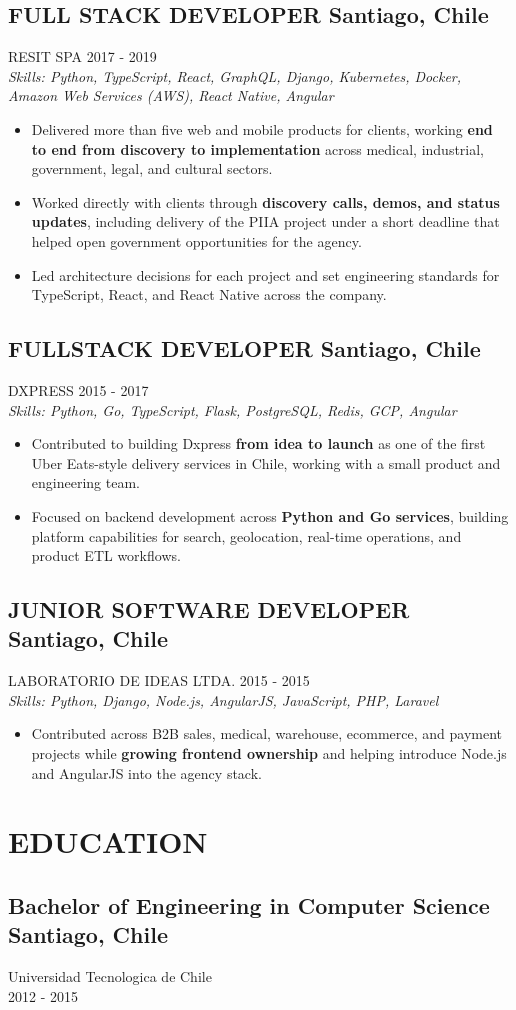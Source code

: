 \documentclass{article}
\newcommand{\SubHeading}[1]{
   \subsection*{#1}\vspace{-0.5em}
}
\newcommand{\WorkExperience}[2]{
   \subsection*{#1}
   \vspace{-1em}
   \uppercase{#2}
}
\newcommand{\Skills}[1]{
   \textit{Skills: #1}
}
\begin{document}
\WorkExperience{FULL STACK DEVELOPER \hfill Santiago, Chile}{Resit SPA \hfill 2017 {-} 2019} \\
\Skills{Python, TypeScript, React, GraphQL, Django, Kubernetes, Docker, Amazon Web Services (AWS), React Native, Angular}
\begin{itemize}
	\item Delivered more than five web and mobile products for clients, working \textbf{end to end from discovery to implementation} across medical, industrial, government, legal, and cultural sectors.
	\item Worked directly with clients through \textbf{discovery calls, demos, and status updates}, including delivery of the PIIA project under a short deadline that helped open government opportunities for the agency.
	\item Led architecture decisions for each project and set engineering standards for TypeScript, React, and React Native across the company.
\end{itemize}

\WorkExperience{FULLSTACK DEVELOPER \hfill Santiago, Chile}{Dxpress \hfill 2015 {-} 2017} \\
\Skills{Python, Go, TypeScript, Flask, PostgreSQL, Redis, GCP, Angular}
\begin{itemize}
	\item Contributed to building Dxpress \textbf{from idea to launch} as one of the first Uber Eats-style delivery services in Chile, working with a small product and engineering team.
	\item Focused on backend development across \textbf{Python and Go services}, building platform capabilities for search, geolocation, real-time operations, and product ETL workflows.
\end{itemize}

\WorkExperience{JUNIOR SOFTWARE DEVELOPER \hfill Santiago, Chile}{Laboratorio de Ideas Ltda. \hfill 2015 {-} 2015} \\
\Skills{Python, Django, Node.js, AngularJS, JavaScript, PHP, Laravel}
\begin{itemize}
	\item Contributed across B2B sales, medical, warehouse, ecommerce, and payment projects while \textbf{growing frontend ownership} and helping introduce Node.js and AngularJS into the agency stack.
\end{itemize}

\section*{EDUCATION}
\SubHeading{Bachelor of Engineering in Computer Science \hfill Santiago, Chile}
Universidad Tecnologica de Chile \\[0.1em]
2012 {-} 2015
\end{document}
